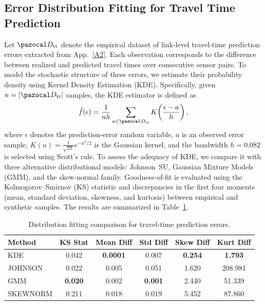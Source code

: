 \documentclass[a4paper,fleqn]{cas-sc}
\begin{document}
\subsection{Error Distribution Fitting for Travel Time Prediction}\label{A3}
Let $\pazocal D_{\text{tt}}$ denote the empirical dataset of link-level travel-time prediction errors extracted from App.~\ref{A2}.
Each observation corresponds to the difference between realized and predicted travel times over consecutive sensor pairs.
%
To model the stochastic structure of these errors, we estimate their probability density using Kernel Density Estimation (KDE).
Specifically, given $n = |\pazocal D_{\text{tt}}|$ samples, the KDE estimator is defined as
\begin{equation}
\hat f(\epsilon)
=\frac{1}{n h}
\sum_{a\in\pazocal D_{\text{tt}}}
K\!\left(\frac{\epsilon-a}{h}\right),
\label{eq:PDF_occRATE}
\end{equation}
where $\epsilon$ denotes the prediction-error random variable, $a$ is an observed error sample,
$K(u)=\frac{1}{\sqrt{2\pi}}e^{-u^{2}/2}$ is the Gaussian kernel, and
the bandwidth $h=0.082$ is selected using Scott’s rule.
%
To assess the adequacy of KDE, we compare it with three alternative distributional models:
Johnson~SU, Gaussian Mixture Models (GMM), and the skew-normal family.
Goodness-of-fit is evaluated using the Kolmogorov--Smirnov (KS) statistic and discrepancies in the first four moments
(mean, standard deviation, skewness, and kurtosis) between empirical and synthetic samples.
The results are summarized in Table~\ref{tab:dist_comparison}.
%
\begin{table}[h]
\centering
\small
\begin{tabular}{lccccc}
\toprule
Method   & KS Stat & Mean Diff & Std Diff & Skew Diff & Kurt Diff \\
\midrule
KDE      & 0.042   & \textbf{0.0001} & 0.007 & \textbf{0.254} & \textbf{1.793} \\
JOHNSON  & 0.022   & 0.005           & 0.051 & 1.620          & 208.981        \\
GMM      & \textbf{0.020} & 0.002   & \textbf{0.001} & 2.440 & 51.339 \\
SKEWNORM & 0.211   & 0.018           & 0.019 & 5.452          & 87.860         \\
\bottomrule
\end{tabular}
\caption{Distribution fitting comparison for travel-time prediction errors.}
\label{tab:dist_comparison}
\end{table}
\end{document}

